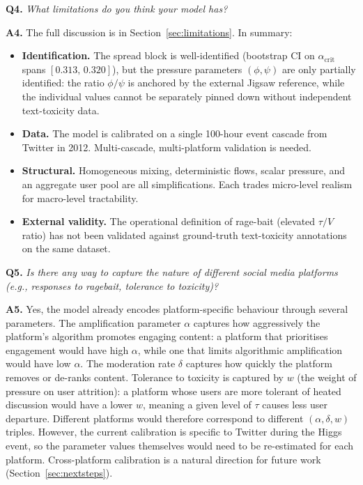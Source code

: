 \documentclass[11pt]{article}
\begin{document}
\bigskip

\noindent\textbf{Q4.} \textit{What limitations do you think your model has?}

\medskip
\noindent\textbf{A4.}
The full discussion is in Section~\ref{sec:limitations}. In summary:
\begin{itemize}[leftmargin=1.5em]
  \item \textbf{Identification.} The spread block is well-identified (bootstrap CI on $\alpha_{\mathrm{crit}}$ spans $[0.313,\,0.320]$), but the pressure parameters $(\phi,\psi)$ are only partially identified: the ratio $\phi/\psi$ is anchored by the external Jigsaw reference, while the individual values cannot be separately pinned down without independent text-toxicity data.
  \item \textbf{Data.} The model is calibrated on a single 100-hour event cascade from Twitter in 2012. Multi-cascade, multi-platform validation is needed.
  \item \textbf{Structural.} Homogeneous mixing, deterministic flows, scalar pressure, and an aggregate user pool are all simplifications. Each trades micro-level realism for macro-level tractability.
  \item \textbf{External validity.} The operational definition of rage-bait (elevated $\tau/V$ ratio) has not been validated against ground-truth text-toxicity annotations on the same dataset.
\end{itemize}

\bigskip

\noindent\textbf{Q5.} \textit{Is there any way to capture the nature of different social media platforms (e.g., responses to ragebait, tolerance to toxicity)?}

\medskip
\noindent\textbf{A5.}
Yes, the model already encodes platform-specific behaviour through several parameters.
The amplification parameter $\alpha$ captures how aggressively the platform's algorithm promotes engaging content: a platform that prioritises engagement would have high $\alpha$, while one that limits algorithmic amplification would have low $\alpha$.
The moderation rate $\delta$ captures how quickly the platform removes or de-ranks content.
Tolerance to toxicity is captured by $w$ (the weight of pressure on user attrition): a platform whose users are more tolerant of heated discussion would have a lower $w$, meaning a given level of $\tau$ causes less user departure.
Different platforms would therefore correspond to different $(\alpha, \delta, w)$ triples.
However, the current calibration is specific to Twitter during the Higgs event, so the parameter values themselves would need to be re-estimated for each platform. Cross-platform calibration is a natural direction for future work (Section~\ref{sec:nextsteps}).
\end{document}
